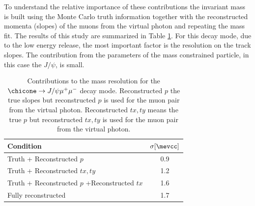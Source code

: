 To understand the relative importance of these contributions the
invariant mass is built using the Monte Carlo truth information together with  the
reconstructed momenta (slopes) of the
muons from the virtual photon and repeating the mass fit. The results
of this study are summarized in Table \ref{tab:rescontrib}. For this
decay mode, due to the low energy release, the most
important factor is the resolution on the track slopes. The contribution from the parameters of the mass constrained
particle, in this case the $J/\psi$, is small.
%
\begin{table}[htb!]
\caption{\small Contributions to the mass resolution for the $\chicone
  \rightarrow J/\psi  \mu^+ \mu^- $ decay mode. Reconstructed $p$
  the true slopes but reconstructed $p$ is used for the muon pair from
  the virtual photon. Reconstructed $tx,ty$ means the true $p$ but reconstructed $tx,ty$ is used for the muon pair from
  the virtual photon.  }
\begin{center}
\small
\begin{tabular}{l|c}
Condition & $\sigma [\mevcc]$   \\
\hline
Truth + Reconstructed $p$ & 0.9  \\
Truth + Reconstructed $tx,ty$ & 1.2\\
Truth + Reconstructed $p$ +Reconstructed $tx$ & 1.6 \\  
Fully reconstructed & 1.7 \\
\end{tabular}
\end{center}
\label{tab:rescontrib}
\end{table}

